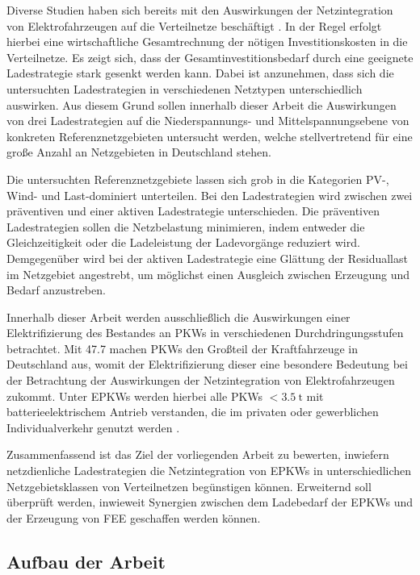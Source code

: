 Diverse Studien haben sich bereits mit den Auswirkungen der Netzintegration von Elektrofahrzeugen auf die Verteilnetze beschäftigt \cite{Agora2019} \cite{DEAGH2018} \cite{BCG2018}.
In der Regel erfolgt hierbei eine wirtschaftliche Gesamtrechnung der nötigen Investitionskosten in die Verteilnetze.
Es zeigt sich, dass der Gesamtinvestitionsbedarf durch eine geeignete Ladestrategie stark gesenkt werden kann.
Dabei ist anzunehmen, dass sich die untersuchten Ladestrategien in verschiedenen Netztypen unterschiedlich auswirken.
Aus diesem Grund sollen innerhalb dieser Arbeit die Auswirkungen von drei Ladestrategien auf die Niederspannungs- und Mittelspannungsebene von konkreten Referenznetzgebieten untersucht werden, welche stellvertretend für eine große Anzahl an Netzgebieten in Deutschland stehen.

Die untersuchten Referenznetzgebiete lassen sich grob in die Kategorien \gls{PV}-, Wind- und Last-dominiert unterteilen.
Bei den Ladestrategien wird zwischen zwei präventiven und einer aktiven Ladestrategie unterschieden.
Die präventiven Ladestrategien sollen die Netzbelastung minimieren, indem entweder die Gleichzeitigkeit oder die Ladeleistung der Ladevorgänge reduziert wird.
Demgegenüber wird bei der aktiven Ladestrategie eine Glättung der Residuallast im Netzgebiet angestrebt, um möglichst einen Ausgleich zwischen Erzeugung und Bedarf anzustreben.\medskip

Innerhalb dieser Arbeit werden ausschließlich die Auswirkungen einer Elektrifizierung des Bestandes an \glspl{PKW} in verschiedenen Durchdringungsstufen betrachtet.
Mit \SI{47.7}{\MioFZs} \cite{KBA2020a} machen \glspl{PKW} den Großteil der Kraftfahrzeuge in Deutschland aus, womit der Elektrifizierung dieser eine besondere Bedeutung bei der Betrachtung der Auswirkungen der Netzintegration von Elektrofahrzeugen zukommt.
Unter \glspl{EPKW} werden hierbei alle \glspl{PKW} \(<\!\SI{3.5}{\tonne}\) mit batterieelektrischem Antrieb verstanden, die im privaten oder gewerblichen Individualverkehr genutzt werden \cite{BNetzA2020}. \medskip

Zusammenfassend ist das Ziel der vorliegenden Arbeit zu bewerten, inwiefern netzdienliche Ladestrategien die Netzintegration von \glspl{EPKW} in unterschiedlichen Netzgebietsklassen von Verteilnetzen begünstigen können.
Erweiternd soll überprüft werden, inwieweit Synergien zwischen dem Ladebedarf der \glspl{EPKW} und der Erzeugung von \gls{FEE} geschaffen werden können.


\subsection{Aufbau der Arbeit}


